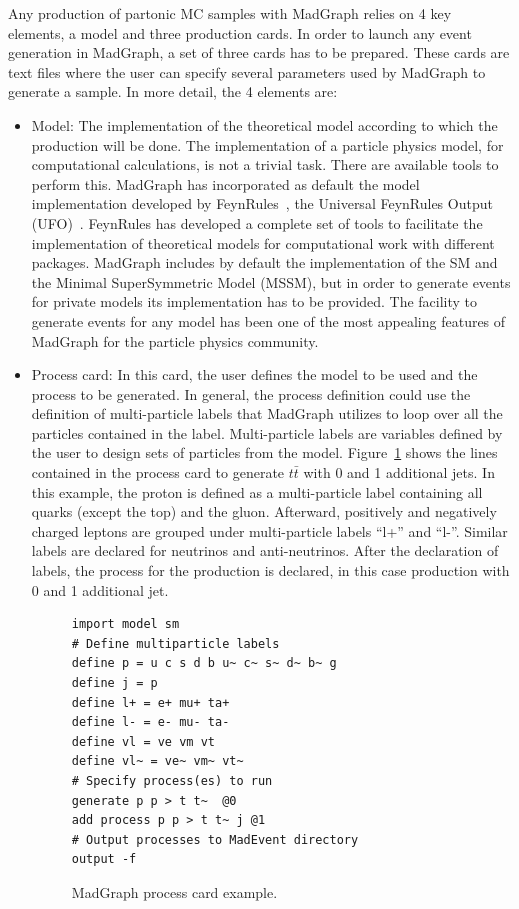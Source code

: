 Any production of partonic MC samples with MadGraph relies on 4 key elements, a model and three production cards. In order to launch any event generation in MadGraph, a set of three cards has to be prepared. These cards are text files where the user can specify several parameters used by MadGraph to generate a sample. In more detail, the 4 elements are:
\begin{itemize}
\item Model: The implementation of the theoretical model according to which the production will be done. The implementation of a particle physics model, for computational calculations, is not a trivial task. There are available tools to perform this. MadGraph has incorporated as default the model implementation developed by FeynRules~\cite{Alloul:2013bka}, the Universal FeynRules Output (UFO)~\cite{Degrande:2011ua}. FeynRules has developed a complete set of tools to facilitate the implementation of theoretical models for computational work with different packages. MadGraph includes by default the implementation of the SM and the Minimal SuperSymmetric Model (MSSM), but in order to generate events for private models its implementation has to be provided. The facility to generate events for any model has been one of the most appealing features of MadGraph for the particle physics community.
\item Process card: In this card, the user defines the model to be used and the process to be generated. In general, the process definition could use the definition of multi-particle labels that MadGraph utilizes to loop over all the particles contained in the label. Multi-particle labels are variables defined by the user to design sets of particles from the model. Figure~\ref{fig:ProcCard} shows the lines contained in the process card to generate $t\bar{t}$ with 0 and 1 additional jets. In this example, the proton is defined as a multi-particle label containing all quarks (except the top) and the gluon. Afterward, positively and negatively charged leptons are grouped under multi-particle labels ``l+'' and ``l-''. Similar labels are declared for neutrinos and anti-neutrinos. After the declaration of labels, the process for the production is declared, in this case \ttbar production with 0 and 1 additional jet.
  \begin{figure}[!Hhtbp]
    \begin{center}
      \begin{minipage}[c]{0.45\textwidth}
\begin{verbatim}
import model sm
# Define multiparticle labels
define p = u c s d b u~ c~ s~ d~ b~ g
define j = p
define l+ = e+ mu+ ta+
define l- = e- mu- ta-
define vl = ve vm vt
define vl~ = ve~ vm~ vt~
# Specify process(es) to run
generate p p > t t~  @0
add process p p > t t~ j @1
# Output processes to MadEvent directory
output -f
\end{verbatim}
        \end{minipage}
          \caption{MadGraph process card example.}
          \label{fig:ProcCard}
      \end{center}
    \end{figure}
    

\end{itemize}
